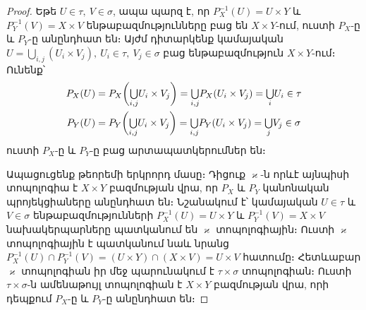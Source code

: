 \documentclass[./main.tex]{subfiles}
\begin{document}
\begin{proof}
Եթե $U\in \tau,\ V\in \sigma$, ապա պարզ է, որ $P_X^{-1} (U)=U\times Y$ և $P_Y^{-1} (V)=X\times V$ ենթաբազմությունները բաց են $X\times Y$-ում, ուստի $P_X$-ը և $P_Y\textrm{-ը}$ անընդհատ են։ Այժմ դիտարկենք կամայական $U=\bigcup\limits_{i,j}(U_i\times V_j),\ U_i\in \tau,\ V_j\in \sigma$ բաց ենթաբազմություն $X\times Y$-ում։ Ունենք՝
\begin{align*}
P_X (U)&=P_X \bigg(\mathsmaller{\bigcup}\limits_{i,j} U_i\times V_j\bigg)=\mathsmaller{\bigcup}\limits_{i,j}P_X (U_i\times V_j)=\mathsmaller{\bigcup}\limits_i U_i\in \tau
\\P_Y (U)&=P_Y\bigg(\mathsmaller{\bigcup}\limits_{i,j}U_i\times V_j\bigg)=\mathsmaller{\bigcup}\limits_{i,j}P_Y(U_i\times V_j)=\mathsmaller{\bigcup}\limits_j V_j\in \sigma
\end{align*}
ուստի $P_X$-ը և $P_Y$-ը բաց արտապատկերումներ են։

\par Ապացուցենք թեորեմի երկրորդ մասը։ Դիցուք $\varkappa$-ն որևէ այնպիսի տոպոլոգիա է $X\times Y$ բազմության վրա, որ $P_X$ և $P_Y$ կանոնական պրոյեկցիաները անընդհատ են։ Նշանակում է՝ կամայական $U \in \tau$ և $V\in \sigma$ ենթաբազմությունների $P_X^{-1}(U)=U\times Y$ և $P_Y^{-1}(V)=X\times V$ նախակերպարները պատկանում են $\varkappa$ տոպոլոգիային։ Ուստի $\varkappa$ տոպոլոգիային է պատկանում նաև նրանց $P_X^{-1}(U)\cap P_Y^{-1}(V)={(U\times Y)}\cap {(X\times V)}=U\times V$ հատումը։ Հետևաբար $\varkappa$ տոպոլոգիան իր մեջ պարունակում է $\tau\times \sigma$ տոպոլոգիան։ Ուստի $\tau\times \sigma$-ն ամենաթույլ տոպոլոգիան է $X\times Y$ բազմության վրա, որի դեպքում $P_X$-ը և $P_Y$-ը անընդհատ են։
\end{proof}
\end{document}
